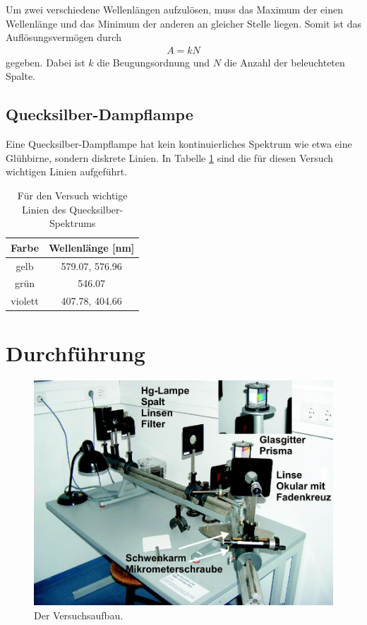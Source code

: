 \documentclass[12pt,a4paper,titlepage,headinclude,bibtotoc]{scrartcl}
\begin{document}
Um zwei verschiedene Wellenlängen aufzulösen, muss das Maximum der einen Wellenlänge und das Minimum der anderen an gleicher Stelle liegen.
Somit ist das Auflösungsvermögen durch
\begin{align}
	A=kN
\end{align}
gegeben.
Dabei ist $k$ die Beugungsordnung und $N$ die Anzahl der beleuchteten Spalte.

\subsection{Quecksilber-Dampflampe}
Eine Quecksilber-Dampflampe hat kein kontinuierliches Spektrum wie etwa eine Glühbirne, sondern diskrete Linien.
In Tabelle \ref{tab:Hg-Linien} sind die für diesen Versuch wichtigen Linien aufgeführt.

\begin{table}
	\centering
	\begin{tabular}{|c|c|}
	    \hline		
		Farbe & Wellenlänge [nm]\\
		\hline
		\hline
		gelb & 579.07, 576.96\\
		\hline		
		grün & 546.07\\
		\hline
		violett & 407.78, 404.66\\
		\hline	
	\end{tabular}
	\caption{Für den Versuch wichtige Linien des Quecksilber-Spektrums}
	\label{tab:Hg-Linien}
\end{table}

\section{Durchführung}
\label{sec:durchfuehrung}

\begin{figure}[!h]
	\centering
	\includegraphics[scale=0.4]{Aufbau.jpg}
	\caption{Der Versuchsaufbau. \cite[Datum: 28.12.2014]{LP19}}
	\label{fig:aufbau}
\end{figure}
\end{document}
